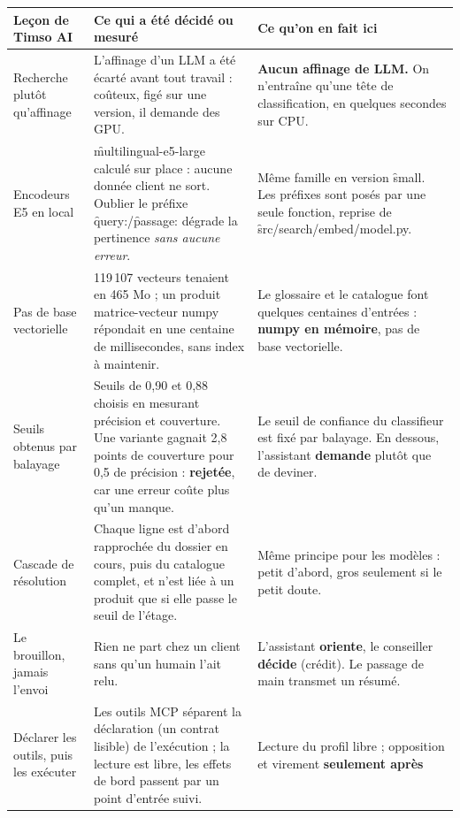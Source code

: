 \begin{center}\small
\begin{longtable}{@{}L{3.4cm} L{5.4cm} L{5.6cm}@{}}
\toprule
\textbf{Leçon de Timso AI} & \textbf{Ce qui a été décidé ou mesuré} & \textbf{Ce qu'on en fait ici} \\
\midrule
\endhead
Recherche plutôt qu'affinage & L'affinage d'un LLM a été écarté avant tout travail : coûteux,
  figé sur une version, il demande des GPU. & \textbf{Aucun affinage de LLM.} On n'entraîne qu'une
  tête de classification, en quelques secondes sur CPU. \\
\addlinespace
Encodeurs E5 en local & \f{multilingual-e5-large} calculé sur place : aucune donnée client ne
  sort. Oublier le préfixe \f{query:}/\f{passage:} dégrade la pertinence \emph{sans aucune
  erreur}. & Même famille en version \f{small}. Les préfixes sont posés par une seule fonction,
  reprise de \f{src/search/embed/model.py}. \\
\addlinespace
Pas de base vectorielle & 119\,107 vecteurs tenaient en 465 Mo ; un produit matrice-vecteur numpy
  répondait en une centaine de millisecondes, sans index à maintenir. & Le glossaire et le
  catalogue font quelques centaines d'entrées : \textbf{numpy en mémoire}, pas de base
  vectorielle. \\
\addlinespace
Seuils obtenus par balayage & Seuils de 0,90 et 0,88 choisis en mesurant précision et couverture.
  Une variante gagnait 2,8 points de couverture pour 0,5 de précision : \textbf{rejetée}, car une
  erreur coûte plus qu'un manque. & Le seuil de confiance du classifieur est fixé par balayage.
  En dessous, l'assistant \textbf{demande} plutôt que de deviner. \\
\addlinespace
Cascade de résolution & Chaque ligne est d'abord rapprochée du dossier en cours, puis du catalogue
  complet, et n'est liée à un produit que si elle passe le seuil de l'étage. & Même principe pour
  les modèles : petit d'abord, gros seulement si le petit doute. \\
\addlinespace
Le brouillon, jamais l'envoi & Rien ne part chez un client sans qu'un humain l'ait relu. &
  L'assistant \textbf{oriente}, le conseiller \textbf{décide} (crédit). Le passage de main
  transmet un résumé. \\
\addlinespace
Déclarer les outils, puis les exécuter & Les outils MCP séparent la déclaration (un contrat
  lisible) de l'exécution ; la lecture est libre, les effets de bord passent par un point
  d'entrée suivi. & Lecture du profil libre ; opposition et virement \textbf{seulement après
}
\end{longtable}
\end{center}
